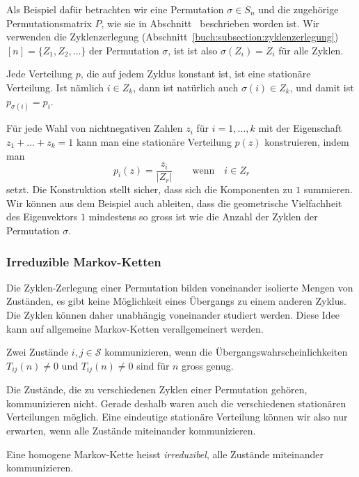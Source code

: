 \begin{beispiel}
Als Beispiel dafür betrachten wir eine Permutation $\sigma\in S_n$
und die zugehörige Permutationsmatrix $P$,
wie sie in Abschnitt~\label{buch:section:permutationsmatrizen}
beschrieben worden ist.
Wir verwenden die 
Zyklenzerlegung (Abschnitt~\ref{buch:subsection:zyklenzerlegung})
\(
[n] = \{ Z_1, Z_2,\dots \}
\)
der Permutation $\sigma$, ist ist also $\sigma(Z_i) = Z_i$ für alle
Zyklen.

Jede Verteilung $p$, die auf jedem Zyklus konstant ist, ist eine
stationäre Verteilung.
Ist nämlich $i\in Z_k$, dann ist natürlich auch $\sigma(i)\in Z_k$,
und damit ist $p_{\sigma(i)}=p_i$.

Für jede Wahl von nichtnegativen Zahlen $z_i$ für $i=1,\dots,k$
mit der Eigenschaft $z_1+\dots+z_k=1$ kann man eine stationäre
Verteilung $p(z)$ konstruieren, indem man
\[
p_i(z)
=
\frac{z_i}{|Z_r|}
\qquad\text{wenn}\quad i\in Z_r
\]
setzt.
Die Konstruktion stellt sicher, dass sich die Komponenten zu $1$
summieren.
Wir können aus dem Beispiel auch ableiten, dass die geometrische
Vielfachheit des Eigenvektors $1$ mindestens so gross ist wie die
Anzahl der Zyklen der Permutation $\sigma$.
\end{beispiel}

\subsubsection{Irreduzible Markov-Ketten}
Die Zyklen-Zerlegung einer Permutation bilden voneinander isolierte
Mengen von Zuständen, es gibt keine Möglichkeit eines Übergangs zu
einem anderen Zyklus.
Die Zyklen können daher unabhängig voneinander studiert werden.
Diese Idee kann auf allgemeine Markov-Ketten verallgemeinert werden.

\begin{definition}
Zwei Zustände $i,j\in\mathcal{S}$ kommunizieren, wenn die
Übergangswahrscheinlichkeiten $T_{ij}(n) \ne 0$ und $T_{ij}(n)\ne 0$ sind
für $n$ gross genug.
\end{definition}

Die Zustände, die zu verschiedenen Zyklen einer Permutation gehören,
kommunizieren nicht.
Gerade deshalb waren auch die verschiedenen stationären Verteilungen
möglich.
Eine eindeutige stationäre Verteilung können wir also nur erwarten,
wenn alle Zustände miteinander kommunizieren.

\begin{definition}
Eine homogene Markov-Kette heisst {\em irreduzibel}, alle Zustände miteinander
kommunizieren.
\end{definition}

